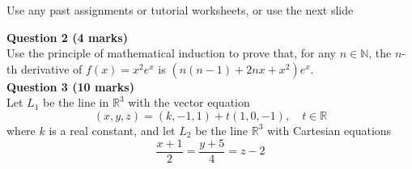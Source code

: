 
\begin{frame}{\insertsection}{}
	\centering
	\Huge{Use any past assignments or tutorial worksheets, or use the next slide}
\end{frame}

\begin{frame}{\insertsection}{}
	\centering
	\begin{minipage}{0.8\textwidth}
		\textbf{Question 2 (4 marks)}\\
		Use the principle of mathematical induction to prove that, for any $n \in \mathbb{N}$, the $n$-th derivative of $f(x) = x^2e^x$ is $\left(n(n-1) + 2nx + x^2\right) e^x$. \vspace{1em}\\
		\textbf{Question 3 (10 marks)}\\
		Let $L_1$ be the line in $\mathbb{R}^3$ with the vector equation
		\begin{equation*}
			(x, y, z) = (k, -1, 1) + t(1, 0, -1), \quad t \in \mathbb{R}
		\end{equation*}
		where $k$ is a real constant, and let $L_2$ be the line $\mathbb{R}^3$  with Cartesian equations
		\begin{equation*}
			\dfrac{x+1}{2} = \dfrac{y + 5}{4} = z - 2
		\end{equation*}
	\end{minipage}
\end{frame}